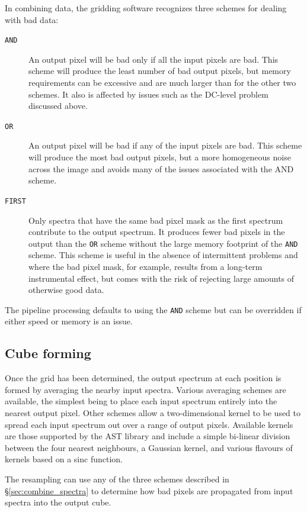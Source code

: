 \documentclass[a4paper,fleqn,usenatbib]{mnras}
\begin{document}
In combining data, the gridding software recognizes three schemes for
dealing with bad data:
\begin{description}
\item[\texttt{AND}] An output pixel will be bad only if all the input
   pixels are bad. This scheme will produce the least number of bad
   output pixels, but memory requirements can be excessive and are much
   larger than for the other two schemes. It also is affected by issues such
   as the DC-level problem discussed above.
\item[\texttt{OR}] An output pixel will be bad if any of the input
   pixels are bad. This scheme will produce the most bad output pixels,
   but a more homogeneous noise across the image and avoids many
   of the issues associated with the AND scheme.
\item[\texttt{FIRST}] Only spectra that have the same bad pixel mask
   as the first spectrum contribute to the output spectrum. It
   produces fewer bad pixels in the output than the \texttt{OR}
   scheme without the large memory footprint of the \texttt{AND} scheme.
   This scheme is useful in the absence of intermittent problems and where
   the bad pixel mask, for example, results from a long-term instrumental effect, but
   comes with the risk of rejecting large amounts of otherwise good data.
\end{description}

The pipeline processing defaults to using the \texttt{AND} scheme but
can be overridden if either speed or memory is an issue.

\subsection{Cube forming}

Once the grid has been determined, the output spectrum at each
position is formed by averaging the nearby input spectra. Various
averaging schemes are available, the simplest being to place each
input spectrum entirely into the nearest output pixel. Other schemes
allow a two-dimensional kernel to be used to spread each input spectrum
out over a range of output pixels. Available kernels are those
supported by the AST library \citep{SUN211,2012ASPC..461..825B} and
include a simple bi-linear division between the four nearest
neighbours, a Gaussian kernel, and various flavours of kernels based
on a sinc function.

The resampling can use any of the three schemes described in
\S\ref{sec:combine_spectra} to determine how bad pixels are propagated
from input spectra into the output cube.
\end{document}
